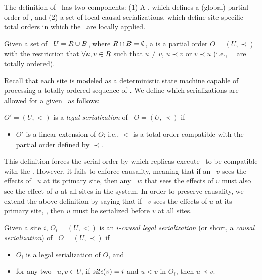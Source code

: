 The definition of \RBc\ has two components:  
(1) A \RBo, which defines a (global) partial order of
\operations, and (2) a set of local causal
serializations, which define site-specific total orders
in which the \operations\ are locally applied.

\begin{mydef}[\RBo]
\label{def:rbo}
Given a set of \transactions\ $U=R\cup B$, where $R\cap B =
\emptyset$, a \emph{\RBo} is a partial order $O=(U,\prec)$ with the
restriction that $\forall u,v \in R$ such that $u \neq v$, $u\prec v$
or $v\prec u$ (i.e., \red\ \operations\ are totally ordered).
\end{mydef}

Recall that each site is modeled as a deterministic state machine
capable of processing a totally ordered sequence of \operations. We
define which serializations are allowed for a given \RBo\ as follows:

\begin{mydef}
$O'=(U,<)$ is a {\em legal serialization} of \RBo\ $O=(U,\prec)$ if
\begin{itemize}
\item
$O'$ is a linear extension of $O$; i.e., $<$ is a total order
compatible with the partial order defined by $\prec$.
\end{itemize}
\label{def:legalserial}
\end{mydef}

This definition forces the serial order by which replicas execute
\operations\ to be compatible with the \RBo. However, it fails to
enforce causality, meaning that if an \operation\ $v$ sees the effects of \operation\ $u$ at its
primary site, then any \operation\ $w$ that sees the effects of $v$
must also see the effect of $u$ at all sites in the system.
In order to preserve causality, we extend the above
definition by saying that if \operation\ $v$ sees the effects of $u$
at its primary site, , then  $u$ must be serialized before $v$ at all sites.

\begin{mydef}
  Given a site $i$, $O_i=(U,<)$ is an {\em $i$-causal legal serialization}
  (or short, a \emph{causal serialization}) of \RBo\ $O=(U,\prec)$ if
 \begin{itemize} 
  \item $O_i$ is a legal serialization of $O$, and 
  \item for any two \operations\ $u,v\in U$, if $\textit{site}(v)=i$ and $u<v$ in $O_i$, then
  $u\prec v$.
 \end{itemize}

\label{def:legalcausalserial}
\end{mydef}

